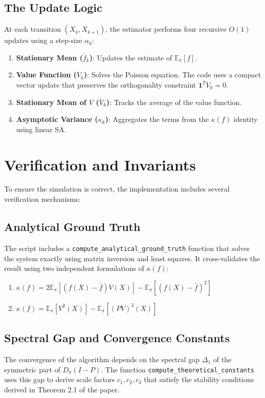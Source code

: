 \documentclass[11pt,a4paper]{article}
\begin{document}
\subsection{The Update Logic}
At each transition $(X_k, X_{k+1})$, the estimator performs four recursive $O(1)$ updates using a step-size $\alpha_k$:
\begin{enumerate}
    \item \textbf{Stationary Mean ($\bar{f}_k$)}: Updates the estimate of $\mathbb{E}_\pi[f]$.
    \item \textbf{Value Function ($V_k$)}: Solves the Poisson equation. The code uses a compact vector update that preserves the orthogonality constraint $\mathbf{1}^T V_k = 0$.
    \item \textbf{Stationary Mean of $V$ ($\bar{V}_k$)}: Tracks the average of the value function.
    \item \textbf{Asymptotic Variance ($\kappa_k$)}: Aggregates the terms from the $\kappa(f)$ identity using linear SA.
\end{enumerate}

\section{Verification and Invariants}
To ensure the simulation is correct, the implementation includes several verification mechanisms:

\subsection{Analytical Ground Truth}
The script includes a \texttt{compute\_analytical\_ground\_truth} function that solves the system exactly using matrix inversion and least squares. It cross-validates the result using two independent formulations of $\kappa(f)$:
\begin{enumerate}
    \item $\kappa(f) = 2\mathbb{E}_\pi[(f(X) - \bar{f})V(X)] - \mathbb{E}_\pi[(f(X) - \bar{f})^2]$
    \item $\kappa(f) = \mathbb{E}_\pi[V^2(X)] - \mathbb{E}_\pi[(PV)^2(X)]$
\end{enumerate}

\subsection{Spectral Gap and Convergence Constants}
The convergence of the algorithm depends on the spectral gap $\Delta_1$ of the symmetric part of $D_\pi(I-P)$. The function \texttt{compute\_theoretical\_constants} uses this gap to derive scale factors $c_1, c_2, c_3$ that satisfy the stability conditions derived in Theorem 2.1 of the paper.
\end{document}
